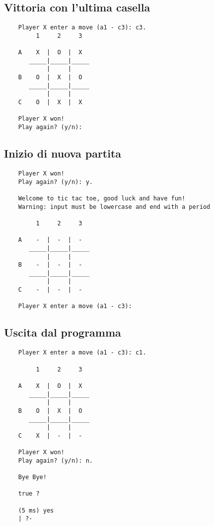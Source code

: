 \documentclass{article}
\begin{document}
\subsection{Vittoria con l'ultima casella}
    \begin{verbatim}
    Player X enter a move (a1 - c3): c3.
         1     2     3

    A    X  |  O  |  X  
       _____|_____|_____
            |     |     
    B    O  |  X  |  O  
       _____|_____|_____
            |     |     
    C    O  |  X  |  X  

    Player X won!
    Play again? (y/n): 
    \end{verbatim}

\subsection{Inizio di nuova partita}
    \begin{verbatim}
    Player X won!
    Play again? (y/n): y.

    Welcome to tic tac toe, good luck and have fun!
    Warning: input must be lowercase and end with a period

         1     2     3

    A    -  |  -  |  -  
       _____|_____|_____
            |     |     
    B    -  |  -  |  -  
       _____|_____|_____
            |     |     
    C    -  |  -  |  -  

    Player X enter a move (a1 - c3):
    \end{verbatim}

\subsection{Uscita dal programma}
    \begin{verbatim}
    Player X enter a move (a1 - c3): c1.

         1     2     3

    A    X  |  O  |  X  
       _____|_____|_____
            |     |     
    B    O  |  X  |  O  
       _____|_____|_____
            |     |     
    C    X  |  -  |  -  

    Player X won!
    Play again? (y/n): n.

    Bye Bye!

    true ? 

    (5 ms) yes
    | ?- 
    \end{verbatim}
\end{document}
